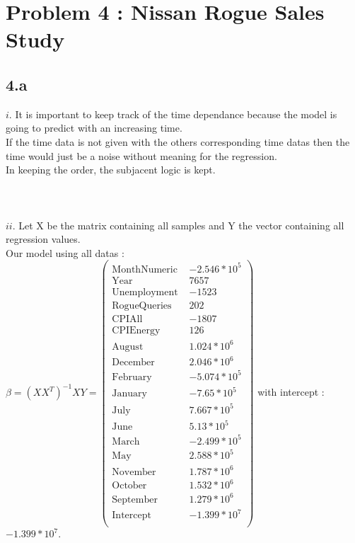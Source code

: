 \documentclass{article}
\begin{document}
    \section*{Problem 4 : Nissan Rogue Sales Study}
    \subsection*{4.a}
    $i$.
    It is important to keep track of the time dependance because the model is going to predict with an increasing time.
    \\
    If the time data is not given with the others corresponding time datas then the time would just be a noise without meaning
    for the regression.
    \\
    In keeping the order, the subjacent logic is kept. 
    \\\\\\\\
    $ii$.
    Let X be the matrix containing all samples and Y the vector containing all regression values.\\
    Our model using all datas :\\ $\beta = (XX^T)^{-1}XY = \left(\begin{array}{lr}
        \text{MonthNumeric } & -2.546 *10^5 \\
        \text{Year } & 7657\\
        \text{Unemployment } & -1523 \\
        \text{RogueQueries } & 202 \\
        \text{CPIAll } & -1807 \\
        \text{CPIEnergy } & 126 \\
        \text{August } & 1.024*10^6 \\
        \text{December } & 2.046*10^6 \\
        \text{February } & -5.074*10^5 \\
        \text{January } & -7.65*10^5 \\
        \text{July } & 7.667*10^5 \\
        \text{June } & 5.13*10^5 \\
        \text{March } & -2.499*10^5 \\
        \text{May } & 2.588*10^5 \\
        \text{November } & 1.787*10^6 \\
        \text{October } & 1.532*10^6\\
        \text{September } & 1.279*10^6\\
        \text{Intercept } & -1.399*10^7\\
    \end{array}\right)$ with intercept : $-1.399*10^7$.\\\\
\end{document}
